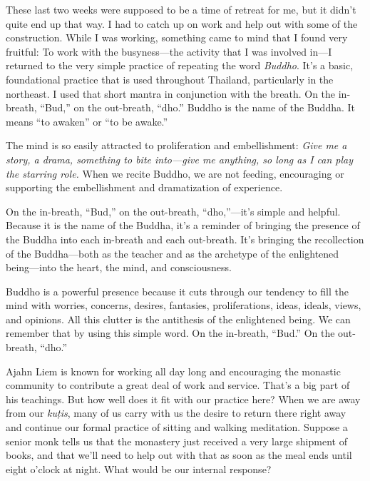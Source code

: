 
These last two weeks were supposed to be a time of retreat for me, but 
it didn't quite end up that way. I had to catch up on work and help out 
with some of the construction. While I was working, something came to 
mind that I found very fruitful: To work with the busyness---the 
activity that I was involved in---I returned to the very simple 
practice of repeating the word \emph{Buddho}. It's a basic, 
foundational practice that is used throughout Thailand, particularly in 
the northeast. I used that short mantra in conjunction with the breath. 
On the in-breath, ``Bud,'' on the out-breath, ``dho.'' Buddho is the 
name of the Buddha. It means ``to awaken'' or ``to be awake.''

The mind is so easily attracted to proliferation and embellishment: 
\emph{Give me a story, a drama, something to bite into---give me 
anything, so long as I can play the starring role.} When we recite 
Buddho, we are not feeding, encouraging or supporting the embellishment 
and dramatization of experience.

On the in-breath, ``Bud,'' on the out-breath, ``dho,''---it's simple 
and helpful. Because it is the name of the Buddha, it's a reminder of 
bringing the presence of the Buddha into each in-breath and each 
out-breath. It's bringing the recollection of the Buddha---both as the 
teacher and as the archetype of the enlightened being---into the heart, 
the mind, and consciousness.

Buddho is a powerful presence because it cuts through our tendency to 
fill the mind with worries, concerns, desires, fantasies, 
proliferations, ideas, ideals, views, and opinions. All this clutter is 
the antithesis of the enlightened being. We can remember that by using 
this simple word. On the in-breath, ``Bud.'' On the out-breath, ``dho.''


Ajahn Liem is known for working all day long and encouraging the 
monastic community to contribute a great deal of work and service. 
That's a big part of his teachings. But how well does it fit with our 
practice here? When we are away from our \emph{kuṭis}, many of us 
carry with us the desire to return there right away and continue our 
formal practice of sitting and walking meditation. Suppose a senior 
monk tells us that the monastery just received a very large shipment of 
books, and that we'll need to help out with that as soon as the meal 
ends until eight o'clock at night. What would be our internal response?

